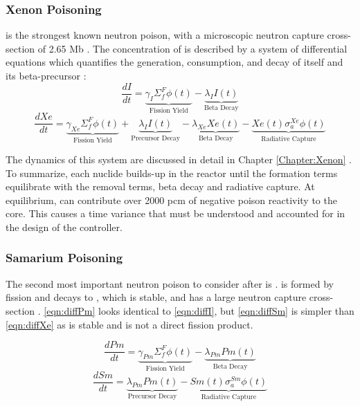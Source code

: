 \subsubsection{Xenon Poisoning}
\Xe is the strongest known neutron poison, with a microscopic neutron capture cross-section of 2.65 Mb \cite[Table II.2]{Lamarsh}. The concentration of \Xe is described by a system of differential equations which quantifies the generation, consumption, and decay of itself and its beta-precursor \I:
\begin{equation}\label{eqn:diffI}
    \frac{dI}{dt} =
    \underbrace{\gamma_{I}\Sigma_{f}^{F}{\phi}(t)}_{\text{Fission Yield}}
    -\underbrace{\lambda_{I}I(t)}_{\text{Beta Decay}}
\end{equation}
\begin{equation}\label{eqn:diffXe}
        \frac{dXe}{dt} =
        \underbrace{\gamma_{Xe}\Sigma_{f}^{F}{\phi}(t)}_{\text{Fission Yield}}
        +
        \underbrace{\lambda_{I}I(t)}_{\text{Precursor Decay}}
        -
        \underbrace{\lambda_{Xe}Xe(t)}_{\text{Beta Decay}}
        -
        \underbrace{Xe(t)\sigma_{a}^{Xe}{\phi}(t)}_{\text{Radiative Capture}}
\end{equation}

The dynamics of this system are discussed in detail in Chapter \ref{Chapter:Xenon} \cite{RootXe}. To summarize, each nuclide builds-up in the reactor until the formation terms equilibrate with the removal terms, beta decay and radiative capture. At equilibrium, \Xe can contribute over 2000 pcm of negative poison reactivity to the core. This causes a time variance that must be understood and accounted for in the design of the controller.

\subsubsection{Samarium Poisoning}
The second most important neutron poison to consider after \Xe is \Sm. \Pm is formed by fission and decays to \Sm, which is stable, and has a large neutron capture cross-section \cite[Ch. 7]{Lamarsh}. \ref{eqn:diffPm} looks identical to \ref{eqn:diffI}, but \ref{eqn:diffSm} is simpler than \ref{eqn:diffXe} as \Sm is stable and is not a direct fission product.

\begin{equation}\label{eqn:diffPm}
    \frac{dPm}{dt} =
    \underbrace{\gamma_{Pm}\Sigma_{f}^{F}{\phi}(t)}_{\text{Fission Yield}}
    -\underbrace{\lambda_{Pm}Pm(t)}_{\text{Beta Decay}}
\end{equation}
\begin{equation}\label{eqn:diffSm}
        \frac{dSm}{dt} =
        \underbrace{\lambda_{Pm}Pm(t)}_{\text{Precursor Decay}}
        -
        \underbrace{Sm(t)\sigma_{a}^{Sm}{\phi}(t)}_{\text{Radiative Capture}}
\end{equation}

